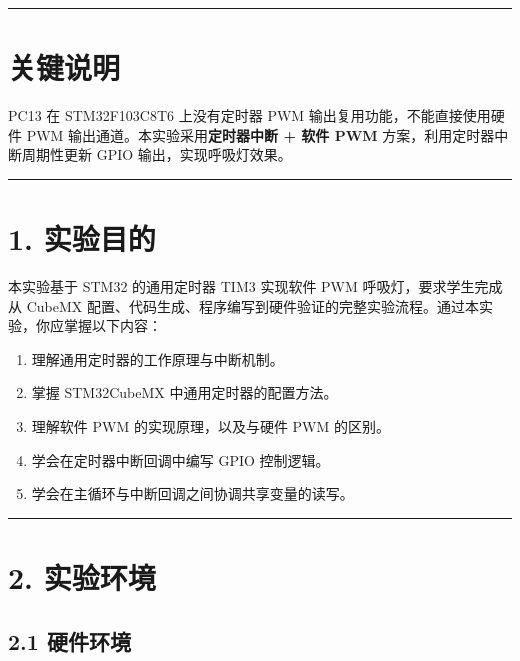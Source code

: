 \documentclass[
  chinese,
  UTF8,
  oneside,
  openany]{ctexbook}
\providecommand{\tightlist}{%
  \setlength{\itemsep}{0pt}\setlength{\parskip}{0pt}}
\begin{document}
\begin{center}\rule{0.5\linewidth}{0.5pt}\end{center}

\section{关键说明}\label{ux5173ux952eux8bf4ux660e}

PC13 在 STM32F103C8T6 上没有定时器 PWM 输出复用功能，不能直接使用硬件
PWM 输出通道。本实验采用\textbf{定时器中断 + 软件 PWM}
方案，利用定时器中断周期性更新 GPIO 输出，实现呼吸灯效果。

\begin{center}\rule{0.5\linewidth}{0.5pt}\end{center}

\section{1. 实验目的}\label{ux5b9eux9a8cux76eeux7684-3}

本实验基于 STM32 的通用定时器 TIM3 实现软件 PWM 呼吸灯，要求学生完成从
CubeMX
配置、代码生成、程序编写到硬件验证的完整实验流程。通过本实验，你应掌握以下内容：

\begin{enumerate}
\def\labelenumi{\arabic{enumi}.}
\tightlist
\item
  理解通用定时器的工作原理与中断机制。
\item
  掌握 STM32CubeMX 中通用定时器的配置方法。
\item
  理解软件 PWM 的实现原理，以及与硬件 PWM 的区别。
\item
  学会在定时器中断回调中编写 GPIO 控制逻辑。
\item
  学会在主循环与中断回调之间协调共享变量的读写。
\end{enumerate}

\begin{center}\rule{0.5\linewidth}{0.5pt}\end{center}

\section{2. 实验环境}\label{ux5b9eux9a8cux73afux5883-3}

\subsection{2.1 硬件环境}\label{ux786cux4ef6ux73afux5883-3}
\end{document}
